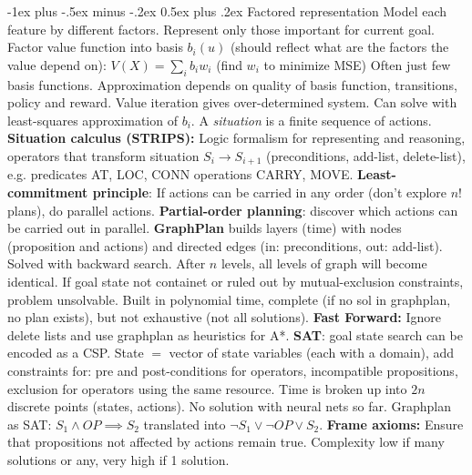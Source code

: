 \documentclass{article}
\makeatletter
\renewcommand{\section}{\@startsection{section}{1}{0mm}%
                                {-1ex plus -.5ex minus -.2ex}%
                                {0.5ex plus .2ex}%
                                {\color{blue}\normalfont\footnotesize\bfseries}}
\newcommand{\disadv}[1]{{\color{red} #1}}
\newcommand{\adv}[1]{{\color{green!60!blue} #1}}
\makeatother
\begin{document}
\begin{multicols*}{4}
\section{Factored representation}
Model each feature by different factors. Represent only those important for current goal.
Factor value function into basis $b_i(u)$ (should reflect what are the factors the value depend on): $V(X)=\sum_i b_i w_i$ (find $w_i$ to minimize MSE) \adv{Often just few basis functions}. \disadv{Approximation depends on quality of basis function}, transitions, policy and reward. Value iteration gives over-determined system. Can solve with least-squares approximation of $b_i$.
A \textit{situation} is a finite sequence of actions. \textbf{Situation calculus (STRIPS): }Logic formalism for representing and reasoning, operators that transform situation $S_i\to S_{i+1}$ (preconditions, add-list, delete-list), e.g. predicates AT, LOC, CONN operations CARRY, MOVE. \textbf{Least-commitment principle}: If actions can be carried in any order (don't explore $n!$ plans), do parallel actions.
\textbf{Partial-order planning}: discover which actions can be carried out in parallel.
\textbf{GraphPlan} builds layers (time) with nodes (proposition and actions) and directed edges (in: preconditions, out: add-list). Solved with backward search. After $n$ levels, all levels of graph will become identical. If goal state not containet or ruled out by mutual-exclusion constraints, problem unsolvable. \adv{Built in polynomial time, complete (if no sol in graphplan, no plan exists)}, \disadv{but not exhaustive (not all solutions)}. \textbf{Fast Forward: }Ignore delete lists and use graphplan as heuristics for A*.
\textbf{SAT}: goal state search can be encoded as a CSP. State $=$ vector of state variables (each with a domain), add constraints for: pre and post-conditions for operators, incompatible propositions, exclusion for operators using the same resource. Time is broken up into $2n$ discrete points (states, actions). No solution with neural nets so far. Graphplan as SAT: $S_1\land OP \implies S_2$ translated into $\neg S_1 \vee \neg OP \vee S_2$. \textbf{Frame axioms: }Ensure that propositions not affected by actions remain true. \disadv{Complexity low if many solutions or any, very high if 1 solution}.


\end{multicols*}
\end{document}
